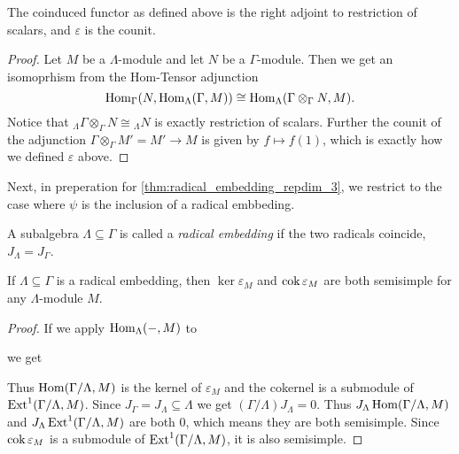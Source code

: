 \begin{prop}\cite[Lemma~2.2]{EHIS04}\label{prop:coinduction_right_adjoint}
	The coinduced functor as defined above is the right adjoint to restriction of scalars, and $\varepsilon$ is the counit.
	\begin{proof}
		Let $M$ be a $\Lambda$-module and let $N$ be a $\Gamma$-module. Then we get an isomoprhism from the Hom-Tensor adjunction 
		$$\operatorname{Hom}_\Gamma(N, \operatorname{Hom}_\Lambda(\Gamma, M)) \cong \operatorname{Hom}_\Lambda(\Gamma\otimes_\Gamma N, M).$$
		Notice that $_\Lambda\Gamma\otimes_\Gamma N \cong {{}_\Lambda N}$ is exactly restriction of scalars. Further the counit of the adjunction $\Gamma\otimes_\Gamma M' = M' \to M$ is given by $f\mapsto f(1)$, which is exactly how we defined $\varepsilon$ above.
	\end{proof}
\end{prop}

Next, in preperation for \cref{thm:radical_embedding_repdim_3}, we restrict to the case where $\psi$ is the inclusion of a radical embbeding.

\begin{defn}
	A subalgebra $\Lambda \subseteq \Gamma$ is called a \emph{radical embedding} if the two radicals coincide, $J_\Lambda = J_\Gamma$.
\end{defn}

\begin{lemma}\cite[Lemma~2.3]{EHIS04}\label{lem:epsilon_semisimple_(co)kernel}
	If $\Lambda \subseteq \Gamma$ is a radical embedding, then $\ker \varepsilon_M$ and $\operatorname{cok}\varepsilon_M$ are both semisimple for any $\Lambda$-module $M$.
	\begin{proof}
		If we apply $\operatorname{Hom}_\Lambda(-, M)$ to  we get 
		\begin{center}
		\end{center}
		Thus $\operatorname{Hom}(\Gamma/\Lambda, M)$ is the kernel of $\varepsilon_M$ and the cokernel is a submodule of $\operatorname{Ext}^1(\Gamma/\Lambda, M)$. Since $J_\Gamma = J_\Lambda \subseteq \Lambda$ we get $(\Gamma/\Lambda)J_\Lambda = 0$. Thus $J_\Lambda\operatorname{Hom}(\Gamma/\Lambda, M)$ and $J_\Lambda\operatorname{Ext}^1(\Gamma/\Lambda, M)$ are both 0, which means they are both semisimple. Since $\operatorname{cok}\varepsilon_M$ is a submodule of $\operatorname{Ext}^1(\Gamma/\Lambda, M)$, it is also semisimple.
	\end{proof}
\end{lemma}

